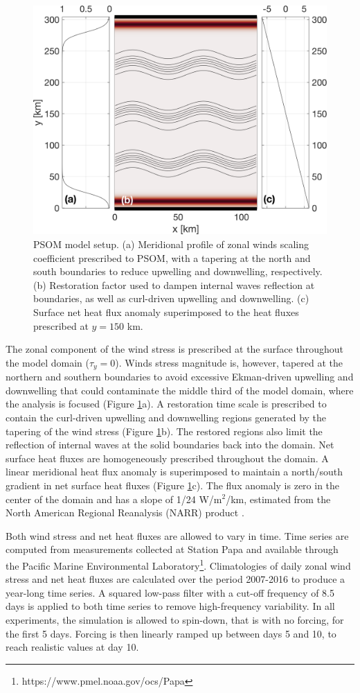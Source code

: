 \documentclass[draft,linenumbers]{agujournal2018}
\begin{document}
\begin{figure}[ht]
	\centering
	\includegraphics[width = .6\linewidth]{figures/Fig1_model_domain}
	\caption{PSOM model setup. (a) Meridional profile of zonal winds scaling coefficient prescribed to PSOM, with a tapering at the north and south boundaries to reduce upwelling and downwelling, respectively. (b) Restoration factor used to dampen internal waves reflection at boundaries, as well as curl-driven upwelling and downwelling. (c) Surface net heat flux anomaly superimposed to the heat fluxes prescribed at $y = 150$ km.}
	\label{fig: model_domain}
\end{figure}

The zonal component of the  wind stress is prescribed at the surface throughout the model domain ($\tau_y =0$). Winds stress magnitude is, however, tapered at the northern and southern boundaries to avoid excessive Ekman-driven upwelling and downwelling that could contaminate the middle third of the model domain, where the analysis is focused (Figure \ref{fig: model_domain}a). A restoration time scale is prescribed to contain the curl-driven upwelling and downwelling regions generated by the tapering of the wind stress (Figure \ref{fig: model_domain}b). The restored regions also limit the reflection of internal waves at the solid boundaries back into the domain. Net surface heat fluxes are homogeneously prescribed throughout the domain. A linear meridional heat flux anomaly is superimposed to maintain a north/south gradient in net surface heat fluxes  (Figure \ref{fig: model_domain}c). The flux anomaly is zero in the center of the domain and has a slope of 1/24 W/m$^2$/km, estimated from the North American Regional Reanalysis (NARR) product \citep{Mesinger_2006}.

Both wind stress and net heat fluxes are allowed to vary in time. Time series are computed from measurements collected at Station Papa and available through the Pacific Marine Environmental Laboratory\footnote{https://www.pmel.noaa.gov/ocs/Papa}. Climatologies of daily zonal wind stress and net heat fluxes are calculated over the period 2007-2016 to produce a year-long time series. A squared low-pass filter with a cut-off frequency of 8.5 days is applied to both time series to remove high-frequency variability. In all experiments, the simulation is allowed to spin-down, that is with no forcing, for the first 5 days. Forcing is then linearly ramped up between days 5 and 10, to reach realistic values at day 10.%
\end{document}
